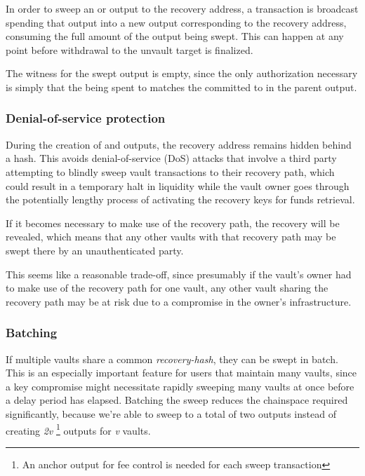 \documentclass[10pt]{article}
\begin{document}
In order to sweep an \opv{} or \opuv{} output to the recovery address, a transaction is
broadcast spending that output into a new output corresponding to the recovery address,
consuming the full amount of the output being swept. This can happen at any point
before withdrawal to the unvault target is finalized. 

The witness for the swept output is empty, since the only authorization necessary 
is simply that the \spk{} being spent to matches the  committed
to in the parent \opv{} output.

\subsubsection*{Denial-of-service protection}

During the creation of \opv{} and \opuv{} outputs, the recovery address remains hidden
behind a hash. This avoids denial-of-service (DoS) attacks that involve a third party
attempting to blindly sweep vault transactions to their recovery path, which could
result in a temporary halt in liquidity while the vault owner goes through the
potentially lengthy process of activating the recovery keys for funds retrieval.

If it becomes necessary to make use of the recovery path, the recovery \spk{} will be
revealed, which means that any other vaults with that recovery path may be swept there
by an unauthenticated party. 

This seems like a reasonable trade-off, since presumably if the vault's owner
had to make use of the recovery path for one vault, any other vault sharing the
recovery path may be at risk due to a compromise in the owner's infrastructure.

\subsubsection*{Batching}

If multiple vaults share a common \emph{recovery-hash}, they can be swept in batch.
This is an especially important feature for users that maintain many vaults, since a key
compromise might necessitate rapidly sweeping many vaults at once before a delay
period has elapsed. Batching the sweep reduces the chainspace required significantly,
because we're able to sweep to a total of two outputs instead of
creating \emph{2v} \footnote{An anchor output for fee control
is needed for each sweep transaction} 
outputs for \emph{v} vaults.
\end{document}

